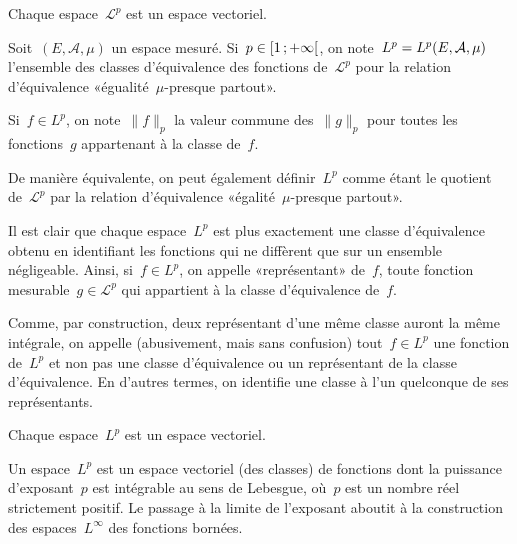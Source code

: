 \begin{theoreme}
Chaque espace~$\mathcal{L}^p$ est un espace vectoriel.
\end{theoreme}

\begin{definition}[Espace~$L^p$]
Soit~$(E,\mathcal{A},\mu)$ un espace mesuré.
Si~$\colorred p\in\intfo{1}{+\infty}$, on note~$\colorblue L^p=L^p(E,\mathcal{A},\mu)$ l'ensemble des
classes d'équivalence des fonctions de~$\mathcal{L}^p$ pour la relation d'équivalence
«égualité~$\mu$-presque partout».

Si~$f\in L^p$, on note~$\|f\|_p$ la valeur commune des~$\| g\| _p$ pour toutes les fonctions~$g$
appartenant à la classe de~$f$.
\end{definition}

De manière équivalente, on peut également définir~$L^p$ comme étant le quotient
de~$\mathcal{L}^p$ par la relation d'équivalence «égalité~$\mu$-presque partout».

\medskip
Il est clair que chaque espace~$L^p$ est plus exactement une classe d'équivalence obtenu en
identifiant les fonctions qui ne diffèrent que sur un ensemble négligeable.
Ainsi, si~$f\in L^p$, on appelle «représentant» de~$f$, toute fonction mesurable~$g\in\mathcal{L}^p$
qui appartient à la classe d'équivalence de~$f$.

Comme, par construction, deux représentant d'une même classe auront la même intégrale, on
appelle (abusivement, mais sans confusion) tout~$f\in L^p$ une fonction de~$L^p$ et non pas une classe 
d'équivalence ou un représentant de la classe d'équivalence.
En d'autres termes, on identifie une classe à l'un quelconque de ses représentants.

\medskip
{}

\begin{theoreme}
Chaque espace~$L^p$ est un espace vectoriel.
\end{theoreme}

Un espace~$L^p$ est un espace vectoriel (des classes) de fonctions dont la puissance d'exposant~$p$ est
intégrable au sens de Lebesgue, où~$p$ est un nombre réel strictement positif.
Le passage à la limite de l'exposant aboutit à la construction des espaces~$L^\infty$ des fonctions
bornées.

